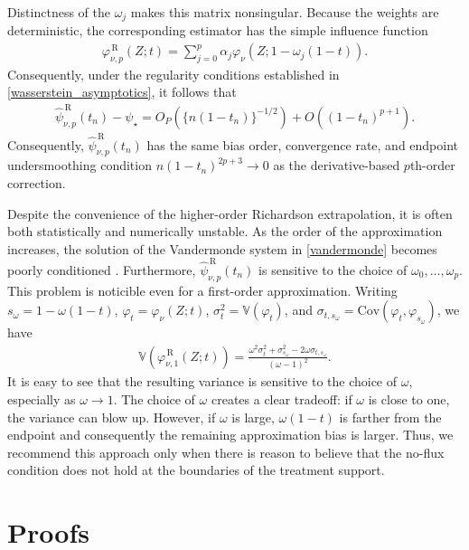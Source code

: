 \documentclass[11pt,twoside]{article}
\theoremstyle{definition}
\theoremstyle{remark}
\begin{document}
Distinctness of the $\omega_j$ makes this matrix nonsingular. Because the weights are deterministic, the corresponding estimator has the simple influence function 
\begin{align*}
    \varphi_{\nu,p}^{\,\mathrm R}(Z;t) = \sum_{j=0}^{p}\alpha_j \varphi_\nu(Z;1-\omega_j(1-t)).
\end{align*}
Consequently, under the regularity conditions established in \cref{wasserstein_asymptotics}, it follows that
\begin{align*}
    \widehat\psi_{\nu,p}^{\,\mathrm R}(t_n)-\psi_\star = O_P\!\left(\{n(1-t_n)\}^{-1/2}\right) +O\!\left((1-t_n)^{p+1}\right).
\end{align*}
Consequently, $\widehat\psi_{\nu,p}^{\,\mathrm R}(t_n)$ has the same bias order, convergence rate, and endpoint undersmoothing condition $n(1-t_n)^{2p+3}\to0$ as the derivative-based $p$th-order correction. 




Despite the convenience of the higher-order Richardson extrapolation, it is often both statistically and numerically unstable. As the order of the approximation increases, the solution of the Vandermonde system in \cref{vandermonde} becomes poorly conditioned \citep{bach2021}. Furthermore, $\widehat\psi_{\nu,p}^{\,\mathrm R}(t_n)$ is sensitive to the choice of $\omega_0, \ldots, \omega_p$. This problem is noticible even for a first-order approximation. Writing $s_\omega=1-\omega(1-t)$, $\varphi_t=\varphi_\nu(Z;t)$, $\sigma_t^2=\mathbb{V}(\varphi_t)$, and $\sigma_{t,s_\omega}=\mathrm{Cov}(\varphi_t,\varphi_{s_\omega})$, we have
\begin{align*}
    \mathbb{V}(\varphi_{\nu,1}^{\,\mathrm R}(Z;t)) = \frac{\omega^2\sigma_t^2+\sigma_{s_\omega}^2-2\omega\sigma_{t,s_\omega}}{(\omega-1)^2}.
\end{align*}
It is easy to see that the resulting variance is sensitive to the choice of $\omega$, especially as $\omega \to 1$. The choice of $\omega$ creates a clear tradeoff: if $\omega$ is close to one, the variance can blow up. However, if $\omega$ is large, $\omega(1 - t)$ is farther from the endpoint and consequently the remaining approximation bias is larger. Thus, we recommend this approach only when there is reason to believe that the no-flux condition does not hold at the boundaries of the treatment support.


\section{Proofs}
\label{sec:proofs}
\end{document}
